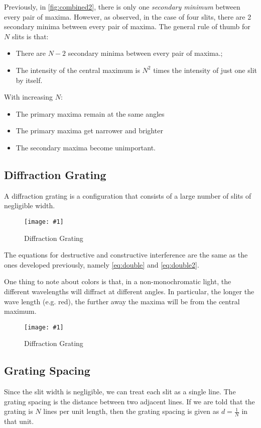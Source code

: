 \documentclass[a4paper,12pt]{article}
\newcommand{\img}[4]{\begin{center}
  \begin{figure}[H]
    \centering
    \texttt{[image: \#1]}
    \caption{#3}
    \label{fig:#4}
  \end{figure}
\end{center}}
\begin{document}
Previously, in \cref{fig:combined2}, there is only one \textit{secondary minimum} between every pair of maxima. However, as observed, in the case of four slits, there are 2 secondary minima between every pair of maxima. The general rule of thumb for $N$ slits is that:
\begin{itemize}
  \item There are $N - 2$ secondary minima between every pair of maxima.;
  \item The intensity of the central maximum is $N^2$ times the intensity of just one slit by itself.
\end{itemize}
With increasing $N$:
\begin{itemize}
  \item The primary maxima remain at the same angles
  \item The primary maxima get narrower and brighter
  \item The secondary maxima become unimportant.
\end{itemize}

\pagebreak

\subsection{Diffraction Grating}

A diffraction grating is a configuration that consists of a large number of slits of negligible width.

\img{gratingintensity.png}{0.3}{Diffraction Grating}{gratingintensity}

The equations for destructive and constructive interference are the same as the ones developed previously, namely \cref{eq:double} and \cref{eq:double2}.

One thing to note about colors is that, in a non-monochromatic light, the different wavelengths will diffract at different angles. In particular, the longer the wave length (e.g. red), the further away the maxima will be from the central maximum.

\img{ex/12.png}{0.3}{Diffraction Grating}{ex12}

\subsection{Grating Spacing}

Since the slit width is negligible, we can treat each slit as a single line. The grating spacing is the distance between two adjacent lines. If we are told that the grating is $N$ lines per unit length, then the grating spacing is given as $d = \frac{1}{N}$
in that unit.
\end{document}
